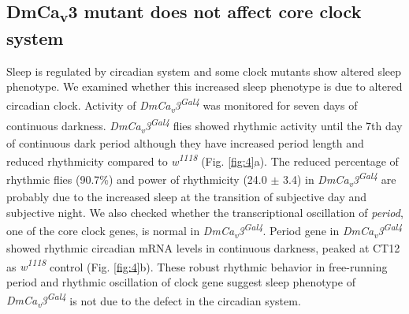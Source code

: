 \subsection*{DmCa\textsubscript{v}3 mutant does not affect core clock system}

Sleep is regulated by circadian system and some clock mutants show altered sleep phenotype\cite{12568241, 19038223}.
We examined whether this increased sleep phenotype is due to altered circadian clock.
Activity of \emph{DmCa\textsubscript{v}3\textsuperscript{Gal4}} was monitored for seven days of continuous darkness.
\emph{DmCa\textsubscript{v}3\textsuperscript{Gal4}} flies showed rhythmic activity until the 7th day of continuous dark period although they have increased period length and reduced rhythmicity compared to \emph{w\textsuperscript{1118}} (Fig. \ref{fig:4}a). The reduced percentage of rhythmic flies (90.7\%) and power of rhythmicity (24.0 $\pm$ 3.4) in \emph{DmCa\textsubscript{v}3\textsuperscript{Gal4}} are probably due to the increased sleep at the transition of subjective day and subjective night.
We also checked whether the transcriptional oscillation of \emph{period}, one of the core clock genes, is normal in \emph{DmCa\textsubscript{v}3\textsuperscript{Gal4}}. 
Period gene in \emph{DmCa\textsubscript{v}3\textsuperscript{Gal4}} showed rhythmic circadian mRNA levels in continuous darkness, peaked at CT12 as \emph{w\textsuperscript{1118}} control (Fig. \ref{fig:4}b).
These robust rhythmic behavior in free-running period and rhythmic oscillation of clock gene suggest sleep phenotype of \emph{DmCa\textsubscript{v}3\textsuperscript{Gal4}} is not due to the defect in the circadian system. 
    
  
  
  
  
  
  
  
  
  